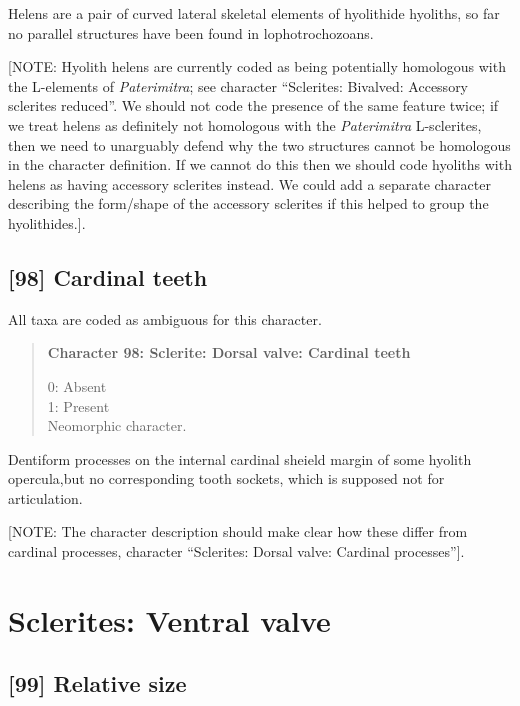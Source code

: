 \documentclass[openany]{book}
\theoremstyle{definition}
\theoremstyle{definition}
\theoremstyle{definition}
\theoremstyle{remark}
\begin{document}
Helens are a pair of curved lateral skeletal elements of hyolithide
hyoliths, so far no parallel structures have been found in
lophotrochozoans.

{[}NOTE: Hyolith helens are currently coded as being potentially
homologous with the L-elements of \emph{Paterimitra}; see character
``Sclerites: Bivalved: Accessory sclerites reduced''. We should not code
the presence of the same feature twice; if we treat helens as definitely
not homologous with the \emph{Paterimitra} L-sclerites, then we need to
unarguably defend why the two structures cannot be homologous in the
character definition. If we cannot do this then we should code hyoliths
with helens as having accessory sclerites instead. We could add a
separate character describing the form/shape of the accessory sclerites
if this helped to group the hyolithides.{]}.

\subsection*{{[}98{]} Cardinal teeth}\label{cardinal-teeth}

All taxa are coded as ambiguous for this character.

\begin{quote}
\textbf{Character 98: Sclerite: Dorsal valve: Cardinal teeth}

0: Absent\\
1: Present\\
Neomorphic character.
\end{quote}

Dentiform processes on the internal cardinal sheield margin of some
hyolith opercula,but no corresponding tooth sockets, which is supposed
not for articulation.

{[}NOTE: The character description should make clear how these differ
from cardinal processes, character ``Sclerites: Dorsal valve: Cardinal
processes''{]}.

\section{Sclerites: Ventral valve}\label{sclerites-ventral-valve}

\subsection*{{[}99{]} Relative size}\label{relative-size}
\end{document}

